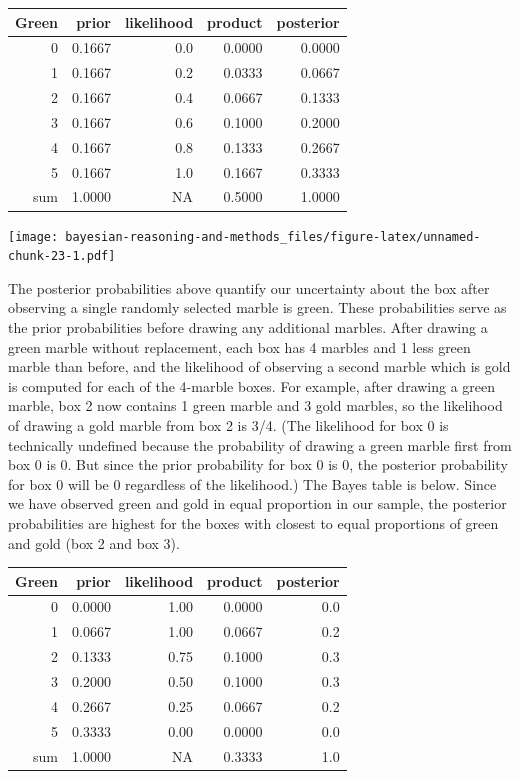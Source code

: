 \documentclass[
]{book}
\theoremstyle{definition}
\theoremstyle{definition}
\theoremstyle{definition}
\theoremstyle{remark}
\begin{document}
\begin{tabular}{r|r|r|r|r}
\hline
Green & prior & likelihood & product & posterior\\
\hline
0 & 0.1667 & 0.0 & 0.0000 & 0.0000\\
\hline
1 & 0.1667 & 0.2 & 0.0333 & 0.0667\\
\hline
2 & 0.1667 & 0.4 & 0.0667 & 0.1333\\
\hline
3 & 0.1667 & 0.6 & 0.1000 & 0.2000\\
\hline
4 & 0.1667 & 0.8 & 0.1333 & 0.2667\\
\hline
5 & 0.1667 & 1.0 & 0.1667 & 0.3333\\
\hline
sum & 1.0000 & NA & 0.5000 & 1.0000\\
\hline
\end{tabular}

\texttt{[image: bayesian-reasoning-and-methods\_files/figure-latex/unnamed-chunk-23-1.pdf]}

The posterior probabilities above quantify our uncertainty about the box after observing a single randomly selected marble is green. These probabilities serve as the prior probabilities before drawing any additional marbles. After drawing a green marble without replacement, each box has 4 marbles and 1 less green marble than before, and the likelihood of observing a second marble which is gold is computed for each of the 4-marble boxes.
For example, after drawing a green marble, box 2 now contains 1 green marble and 3 gold marbles, so the likelihood of drawing a gold marble from box 2 is 3/4.
(The likelihood for box 0 is technically undefined because the probability of drawing a green marble first from box 0 is 0. But since the prior probability for box 0 is 0, the posterior probability for box 0 will be 0 regardless of the likelihood.)
The Bayes table is below. Since we have observed green and gold in equal proportion in our sample, the posterior probabilities are highest for the boxes with closest to equal proportions of green and gold (box 2 and box 3).

\begin{tabular}{r|r|r|r|r}
\hline
Green & prior & likelihood & product & posterior\\
\hline
0 & 0.0000 & 1.00 & 0.0000 & 0.0\\
\hline
1 & 0.0667 & 1.00 & 0.0667 & 0.2\\
\hline
2 & 0.1333 & 0.75 & 0.1000 & 0.3\\
\hline
3 & 0.2000 & 0.50 & 0.1000 & 0.3\\
\hline
4 & 0.2667 & 0.25 & 0.0667 & 0.2\\
\hline
5 & 0.3333 & 0.00 & 0.0000 & 0.0\\
\hline
sum & 1.0000 & NA & 0.3333 & 1.0\\
\hline
\end{tabular}
\end{document}
